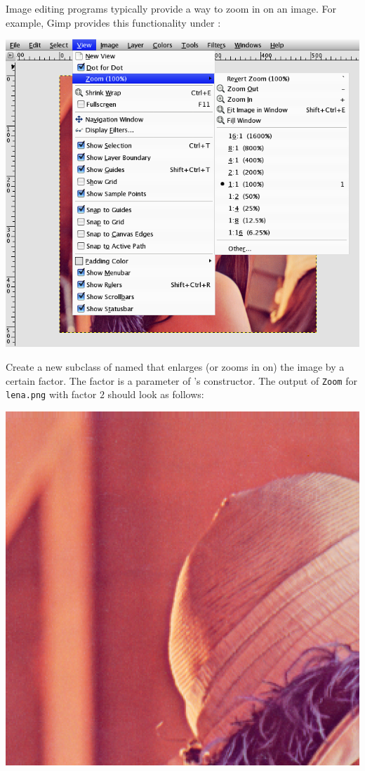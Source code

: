 \documentclass{book}
\begin{document}
\begin{exercise}\label{ex:zoom}
Image editing programs typically provide a way to zoom in on an image. For example, Gimp provides this functionality under :
\begin{center}
\includegraphics[scale=0.3]{gimp-zoom.png}
\end{center} 
Create a new subclass of  named  that enlarges (or zooms in on) the image by a certain factor. The factor is a parameter of 's constructor. The output of \texttt{Zoom} for \texttt{lena.png} with factor $2$ should look as follows:
\begin{center}
\includegraphics[scale=0.2]{lena-zoom-2.png}
\end{center} 
\end{exercise}
\end{document}
